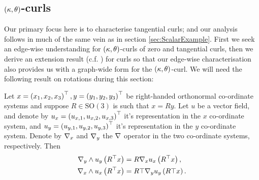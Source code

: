 \subsection{$\left( \kappa,\theta \right)$-curls} \label{sec:ktCurls}
Our primary focus here is to characterise tangential curls; and our analysis follows in much of the same vein as in section \ref{sec:ScalarExample}.
First we seek an edge-wise understanding for $\left( \kappa, \theta \right)$-curls of zero and tangential curls, then we derive an extension result (c.f. ) for curls so that our edge-wise characterisation also provides us with a graph-wide form for the $\left( \kappa, \theta \right)$-curl.
We will need the following result on rotations during this section:
\begin{lemma} \label{lem:CurlUnderRotation}
	Let $x=\left( x_1,x_2,x_3 \right)^\top, y=\left( y_1,y_2,y_3 \right)^\top$ be right-handed orthonormal co-ordinate systems and suppose $R\in\mathrm{SO}(3)$ is such that $x=Ry$.
	Let $u$ be a vector field, and denote by $u_x =\left( u_{x,1},u_{x,2},u_{x,3} \right)^\top$ it's representation in the $x$ co-ordinate system, and $u_y =\left( u_{y,1},u_{y,2},u_{y,3} \right)^\top$ it's representation in the $y$ co-ordinate system.
	Denote by $\nabla_x$ and $\nabla_y$ the $\nabla$ operator in the two co-ordinate systems, respectively.
	Then
	\begin{align*}
		\nabla_y\wedge u_y\left( R^\top x \right) &= R \nabla_x u_x\left( R^\top x \right), \\
		\nabla_x\wedge u_x\left( R^\top x \right) &= R\top\nabla_y u_y\left( R\top x \right).
	\end{align*}
\end{lemma}
